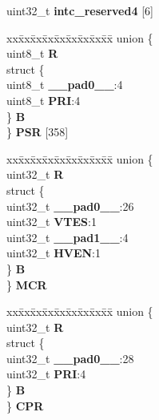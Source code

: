 \begin{DoxyCompactItemize}
\begin{tabbing}
\end{tabbing}\item 
\mbox{\label{structINTC__tag_a0f083fd657b027c61b377f673cd9079d}} 
uint32\+\_\+t {\bfseries intc\+\_\+reserved4} \mbox{[}6\mbox{]}
\item 
\mbox{\label{structINTC__tag_a85d15b7920898ab2367d3b0dc96f060e}} 
\begin{tabbing}
xx\=xx\=xx\=xx\=xx\=xx\=xx\=xx\=xx\=\kill
union \{\\
\>uint8\_t {\bfseries R}\\
\>struct \{\\
\>\>uint8\_t {\bfseries \_\_pad0\_\_}:4\\
\>\>uint8\_t {\bfseries PRI}:4\\
\>\} {\bfseries B}\\
\} {\bfseries PSR} \mbox{[}358\mbox{]}\\

\end{tabbing}\item 
\mbox{\label{structINTC__tag_abdcfc150bef4e19972abc48c231ec14f}} 
\begin{tabbing}
xx\=xx\=xx\=xx\=xx\=xx\=xx\=xx\=xx\=\kill
union \{\\
\>uint32\_t {\bfseries R}\\
\>struct \{\\
\>\>uint32\_t {\bfseries \_\_pad0\_\_}:26\\
\>\>uint32\_t {\bfseries VTES}:1\\
\>\>uint32\_t {\bfseries \_\_pad1\_\_}:4\\
\>\>uint32\_t {\bfseries HVEN}:1\\
\>\} {\bfseries B}\\
\} {\bfseries MCR}\\

\end{tabbing}\item 
\mbox{\label{structINTC__tag_aa9c600ee410c1130645d2821e94d3fb4}} 
\begin{tabbing}
xx\=xx\=xx\=xx\=xx\=xx\=xx\=xx\=xx\=\kill
union \{\\
\>uint32\_t {\bfseries R}\\
\>struct \{\\
\>\>uint32\_t {\bfseries \_\_pad0\_\_}:28\\
\>\>uint32\_t {\bfseries PRI}:4\\
\>\} {\bfseries B}\\
\} {\bfseries CPR}\\


\end{tabbing}
\end{DoxyCompactItemize}
